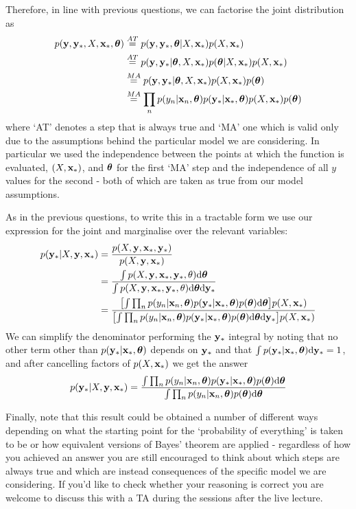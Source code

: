 \documentclass[a4paper]{article}
\theoremstyle{definition}
\begin{document}
Therefore, in line with previous questions, we can factorise the joint distribution as
\begin{align}
p(\mathbf{y}, \mathbf{y}_*, X, \mathbf{x}_*, \boldsymbol{\theta}) &\stackrel{AT}{=} p(\mathbf{y}, \mathbf{y}_* , \boldsymbol{\theta}| X, \mathbf{x}_*) p(X, \mathbf{x}_*) \\
& \stackrel{AT}{=} p(\mathbf{y}, \mathbf{y}_* | \boldsymbol{\theta}, X, \mathbf{x}_*) p(\boldsymbol{\theta} | X, \mathbf{x}_*) p(X, \mathbf{x}_*) \\
& \stackrel{MA}{=} p(\mathbf{y}, \mathbf{y}_* | \boldsymbol{\theta}, X, \mathbf{x}_*) p(X, \mathbf{x}_*) p(\boldsymbol{\theta}) \\
& \stackrel{MA}{=} \prod_n p(y_n | \mathbf{x}_n, \boldsymbol{\theta}) p(\mathbf{y}_* | \mathbf{x}_*, \boldsymbol{\theta}) p(X, \mathbf{x}_*) p(\boldsymbol{\theta})
\end{align}
where `AT' denotes a step that is always true and `MA' one which is valid only due to the assumptions behind the particular model we are considering. In particular we used the independence between the points at which the function is evaluated, $(X, \mathbf{x}_*)$, and $\boldsymbol{\theta}$ for the first `MA' step and the independence of all $y$ values for the second - both of which are taken as true from our model assumptions.

As in the previous questions, to write this in a tractable form we use our expression for the joint and marginalise over the relevant variables:
\begin{align}
p(\vy_* | X, \vy, \vx_*) &= \frac{ p(X, \vy, \vx_*, \vy_*)}{p(X,\vy, \vx_*)} \\ 
&=\frac{\int p(X, \vy, \vx_*, \vy_*, \theta) \calcd{\vtheta}}{\int p(X, \vy, \vx_*, \vy_*, \theta) \calcd{\vtheta}\calcd{\vy_*}}  \\
& =\frac{\left[ \int \prod_n p(y_n | \vx_n, \vtheta) p(\vy_* | \vx_*, \vtheta) p(\vtheta) \calcd{\vtheta}\right] p(X, \vx_*) }{\left[\int \prod_n p(y_n | \vx_n, \vtheta) p(\vy_* | \vx_*, \vtheta)p(\vtheta) \calcd{\vtheta}\calcd{\vy_*}\right] p(X, \vx_*) }
\end{align}
We can simplify the denominator performing the $\mathbf{y}_*$ integral by noting that no other term other than  $p(\mathbf{y}_* | \mathbf{x}_*, \boldsymbol{\theta})$ depends on $\mathbf{y}_*$ and that $\int p(\mathbf{y}_* | \mathbf{x}_*, \boldsymbol{\theta}) \mathrm{d}{\mathbf{y}_*} = 1$, and after cancelling factors of $p(X, \mathbf{x}_*)$ we get the answer
\begin{equation}
p(\mathbf{y}_* | X,\mathbf{y}, \mathbf{x}_*) = \frac{\int \prod_n p(y_n | \mathbf{x}_n, \boldsymbol{\theta}) p(\mathbf{y}_* | \mathbf{x}_*, \boldsymbol{\theta}) p(\boldsymbol{\theta}) \mathrm{d}{\boldsymbol{\theta}} }{\int \prod_n p(y_n | \mathbf{x}_n, \boldsymbol{\theta}) p(\boldsymbol{\theta}) \mathrm{d}{\boldsymbol{\theta}}}
\end{equation}

Finally, note that this result could be obtained a number of different ways depending on what the starting point for the `probability of everything' is taken to be or how equivalent versions of Bayes' theorem are applied - regardless of how you achieved an answer you are still encouraged to think about which steps are always true and which are instead consequences of the specific model we are considering. If you'd like to check whether your reasoning is correct you are welcome to discuss this with a TA during the sessions after the live lecture.
\end{document}
